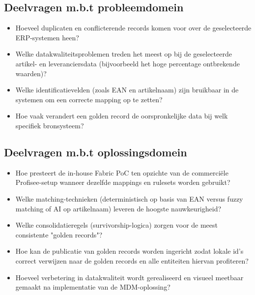 \subsection{Deelvragen m.b.t probleemdomein}
\begin{itemize}
    \item Hoeveel duplicaten en conflicterende records komen voor over de geselecteerde ERP-systemen heen?
    \item Welke datakwaliteitsproblemen treden het meest op bij de geselecteerde artikel- en leveranciersdata (bijvoorbeeld het hoge percentage ontbrekende waarden)?
    \item Welke identificatievelden (zoals EAN en artikelnaam) zijn bruikbaar in de systemen om een correcte mapping op te zetten?
    \item Hoe vaak verandert een golden record de oorspronkelijke data bij welk specifiek bronsysteem?
\end{itemize}

\subsection{Deelvragen m.b.t oplossingsdomein}
\begin{itemize}
    \item Hoe presteert de in-house Fabric PoC ten opzichte van de commerciële Profisee-setup wanneer dezelfde mappings en rulesets worden gebruikt?
    \item Welke matching-technieken (deterministisch op basis van EAN versus fuzzy matching of AI op artikelnaam) leveren de hoogste nauwkeurigheid?
    \item Welke consolidatieregels (survivorship-logica) zorgen voor de meest consistente "golden records"?
    \item Hoe kan de publicatie van golden records worden ingericht zodat lokale id's correct verwijzen naar de golden records en alle entiteiten hiervan profiteren?
    \item Hoeveel verbetering in datakwaliteit wordt gerealiseerd en visueel meetbaar gemaakt na implementatie van de MDM-oplossing?
\end{itemize}

\section{}%
\label{sec:opzet-bachelorproef}

